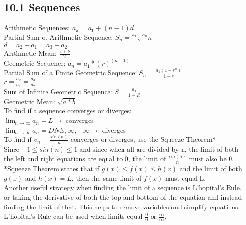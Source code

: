 \documentclass{article}
\begin{document}
        \subsection*{10.1 Sequences}
            Arithmetic Sequences: $a_{n} = a_{1} + (n-1)d$ \\
            Partial Sum of Arithmetic Sequence: $S_{n} = \frac{a_{1} + a_{n}}{2} n$ \\
            $d = a_{2} - a_{1} = a_{3} - a_{2}$ \\
            Arithmetic Mean: $\frac{a+b}{2}$ \\
            Geometric Sequence: $a_{n} = a_{1} * (r)^(n-1) $ \\
            Partial Sum of a Finite Geometric Sequence: $S_{n} = \frac{a_{1}(1-r^n)}{1-r}$ \\ 
            $r = \frac{a_{2}}{a_{1}} = \frac{a_{3}}{a_{2}}$ \\
            Sum of Infinite Geometric Sequence: $S = \frac{a_{1}}{1-R}$ \\
            Geometric Mean: $\sqrt{a*b}$ \\
            To find if a sequence converges or diverges: \\
            $\lim_{n\to\infty} a_{n} = L \rightarrow$ converges \\
            $\lim_{n\to\infty} a_{n} = DNE, \infty, -\infty  \rightarrow$ diverges \\
            To find if $a_{n} = \frac{sin(n)}{n}$ converges or diverges, use the Squeeze Theorem* \\ 
            Since $-1 \leq sin(n) \leq 1$ and since when all are divided by n, the limit of both the left and right equations are equal to 0, the limit of $\frac{sin(n)}{n}$ must also be 0. \\
            *Squeeze Theorem states that if $g(x) \leq f(x) \leq h(x)$ and the limit of both $g(x)$ and $h(x) = L$, then the same limit of $f(x)$ must equal L. \\
            Another useful strategy when finding the limit of a sequence is L'hopital's Rule, or taking the derivative of both the top and bottom of the equation and instead finding the limit of that. This helps to remove variables and simplify equations. \\
            L'hopital's Rule can be used when limits equal $\frac{0}{0}$ or $\frac{\infty}{\infty}$. \\

        \color{ForestGreen}
\end{document}
